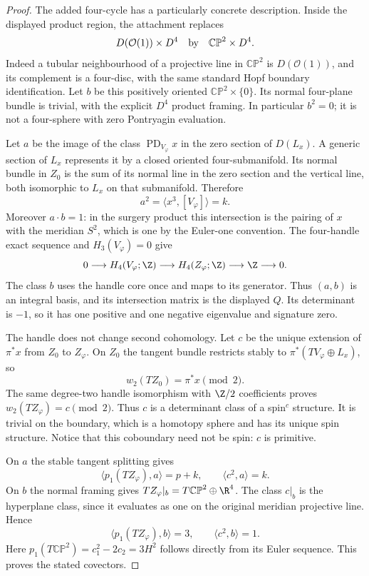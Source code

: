 \begin{proof}
The added four-cycle has a particularly concrete description.
Inside the displayed product region, the attachment replaces
\[
 D(\mathcal O(1))\times D^4
 \quad\hbox{by}\quad \mathbb{CP}^2\times D^4.
\]
Indeed a tubular neighbourhood of a projective line in
$\mathbb{CP}^2$ is $D(\mathcal O(1))$, and its complement is a
four-disc, with the same standard Hopf boundary identification.
Let $b$ be this positively oriented $\mathbb{CP}^2\times\{0\}$.
Its normal four-plane bundle is trivial, with the explicit
$D^4$ product framing. In particular $b^2=0$; it is not a
four-sphere with zero Pontryagin evaluation.

Let $a$ be the image of the class $\operatorname{PD}_{V_\varphi}x$
in the zero section of $D(L_x)$. A generic section of $L_x$
represents it by a closed oriented four-submanifold. Its normal
bundle in $Z_0$ is the sum of its normal line in the zero section
and the vertical line, both isomorphic to $L_x$ on that
submanifold. Therefore
\[
 a^2=\langle x^3,[V_\varphi]\rangle=k.
\]
Moreover $a\cdot b=1$: in the surgery product this intersection
is the pairing of $x$ with the meridian $S^2$, which is one by
the Euler-one convention. The four-handle exact sequence and
$H_3(V_\varphi)=0$ give
\[
 0\longrightarrow H_4(V_\varphi;\Z)
 \longrightarrow H_4(Z_\varphi;\Z)
 \longrightarrow\Z\longrightarrow0.
\]
The class $b$ uses the handle core once and maps to its generator.
Thus $(a,b)$ is an integral basis, and its intersection matrix is
the displayed $Q$. Its determinant is $-1$, so it has one
positive and one negative eigenvalue and signature zero.

The handle does not change second cohomology. Let $c$ be the
unique extension of $\pi^*x$ from $Z_0$ to $Z_\varphi$.
On $Z_0$ the tangent bundle restricts stably to
$\pi^*(TV_\varphi\oplus L_x)$, so
\[
 w_2(TZ_0)=\pi^*x\pmod2.
\]
The same degree-two handle isomorphism with $\Z/2$ coefficients
proves $w_2(TZ_\varphi)=c\pmod2$. Thus $c$ is a determinant
class of a spin$^c$ structure. It is trivial on the boundary,
which is a homotopy sphere and has its unique spin structure.
Notice that this coboundary need not be spin: $c$ is primitive.

On $a$ the stable tangent splitting gives
\[
 \langle p_1(TZ_\varphi),a\rangle=p+k,
 \qquad \langle c^2,a\rangle=k.
\]
On $b$ the normal framing gives
$TZ_\varphi|_b=T\mathbb{CP}^2\oplus\R^4$.
The class $c|_b$ is the hyperplane class, since it evaluates as
one on the original meridian projective line. Hence
\[
 \langle p_1(TZ_\varphi),b\rangle=3,
 \qquad \langle c^2,b\rangle=1.
\]
Here $p_1(T\mathbb{CP}^2)=c_1^2-2c_2=3H^2$ follows directly
from its Euler sequence. This proves the stated covectors.


\end{proof}
